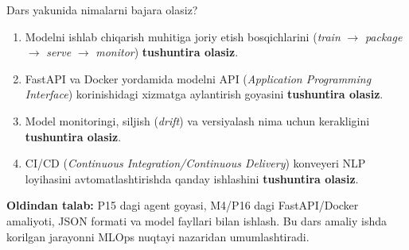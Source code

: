 \documentclass[aspectratio=169,11pt]{beamer}
\newcommand{\uzq}{\textquotesingle{}}   %
\begin{document}
\begin{frame}{Dars yakunida nimalarni bajara olasiz?}
  \small

  \begin{enumerate}\setlength\itemsep{5pt}
    \item Modelni ishlab chiqarish muhitiga joriy etish bosqichlarini
          (\textit{train} $\to$ \textit{package} $\to$ \textit{serve} $\to$ \textit{monitor})
          \textbf{tushuntira olasiz}.

    \item FastAPI va Docker yordamida modelni API
          (\textit{Application Programming Interface}) ko\uzq{}rinishidagi xizmatga
          aylantirish g\uzq{}oyasini \textbf{tushuntira olasiz}.

    \item Model monitoringi, siljish (\textit{drift}) va versiyalash
          nima uchun kerakligini \textbf{tushuntira olasiz}.

    \item CI/CD (\textit{Continuous Integration/Continuous Delivery}) konveyeri
          NLP loyihasini avtomatlashtirishda qanday ishlashini
          \textbf{tushuntira olasiz}.
  \end{enumerate}

  \vspace{5pt}

  \begin{tcolorbox}[defbox]
    \footnotesize
    \textbf{Oldindan talab:}
    P15 dagi agent g\uzq{}oyasi, M4/P16 dagi FastAPI/Docker amaliyoti,
    JSON formati va model fayllari bilan ishlash.
    Bu dars amaliy ishda ko\uzq{}rilgan jarayonni MLOps nuqtayi nazaridan
    umumlashtiradi.
  \end{tcolorbox}
\end{frame}
\end{document}
